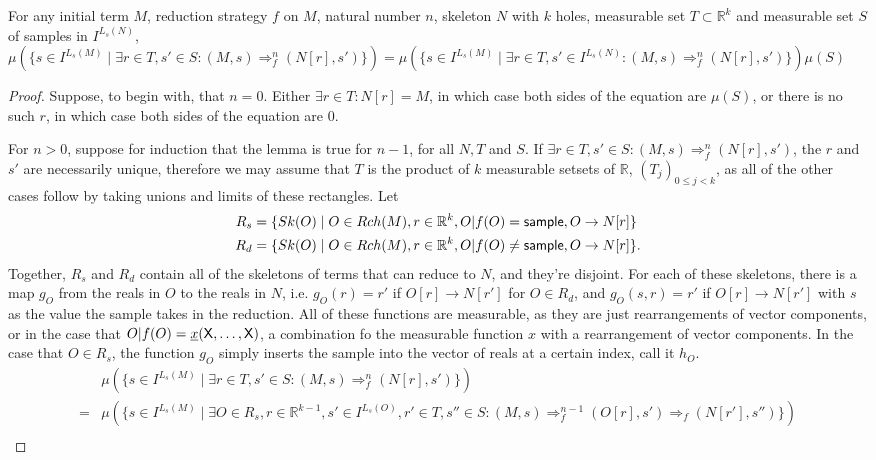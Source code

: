 \begin{lemma} \label{lem:independentSamples}
For any initial term $M$, reduction strategy $f$ on $M$, natural number $n$, skeleton $N$ with $k$ holes, measurable set $T \subset \mathbb R ^ k$ and measurable set $S$ of samples in $I^{L_s(N)}$, $\mu(\{s \in I^{L_s(M)} \mid \exists r \in T, s' \in S : (M,s) \Rightarrow_f^n (N[r], s')\}) = \mu(\{s \in I^{L_s(M)} \mid \exists r \in T, s' \in I^{L_s(N)} : (M,s) \Rightarrow_f^n (N[r], s')\}) \mu(S)$
\end{lemma}
\begin{proof}
Suppose, to begin with, that $n = 0$. Either $\exists r \in T : N[r] = M$, in which case both sides of the equation are $\mu(S)$, or there is no such $r$, in which case both sides of the equation are 0.

For $n > 0$, suppose for induction that the lemma is true for $n - 1$, for all $N, T$ and $S$. If $\exists r \in T, s' \in S : (M,s) \Rightarrow_f^n (N[r], s')$, the $r$ and $s'$ are necessarily unique, therefore we may assume that $T$ is the product of $k$ measurable setsets of $\mathbb R$, $(T_j)_{0 \leq j < k}$, as all of the other cases follow by taking unions and limits of these rectangles. Let\begin{align*}
R_s & = \{Sk(O) \mid O \in Rch(M), r \in \mathbb R^k, O | f(O) = \mathsf{sample}, O \to N[r]\} \\
R_d & = \{Sk(O) \mid O \in Rch(M), r \in \mathbb R^k, O | f(O) \neq \mathsf{sample}, O \to N[r]\}.
\end{align*}
Together, $R_s$ and $R_d$ contain all of the skeletons of terms that can reduce to $N$, and they're disjoint. For each of these skeletons, there is a map $g_O$ from the reals in $O$ to the reals in $N$, i.e. $g_O(r) = r'$ if $O[r] \to N[r']$ for $O \in R_d$, and $g_O(s, r) = r'$ if $O[r] \to N[r']$ with $s$ as the value the sample takes in the reduction. All of these functions are measurable, as they are just rearrangements of vector components, or in the case that $O|f(O) = \underline x(\mathsf{X}, \dots, \mathsf{X})$, a combination fo the measurable function $x$ with a rearrangement of vector components. In the case that $O \in R_s$, the function $g_O$ simply inserts the sample into the vector of reals at a certain index, call it $h_O$.
\clearpage
\begin{align*}
& \mu(\{s \in I^{L_s(M)} \mid \exists r \in T, s' \in S : (M,s) \Rightarrow_f^n (N[r], s')\}) \\
= & \mu(\{s \in I^{L_s(M)} \mid \exists O \in R_s, r \in \mathbb R^{k-1}, s' \in I^{L_s(O)}, r' \in T, s'' \in S : (M,s) \Rightarrow_f^{n-1} (O[r], s') \Rightarrow_f (N[r'], s'')\})\\

\end{align*}
\end{proof}
